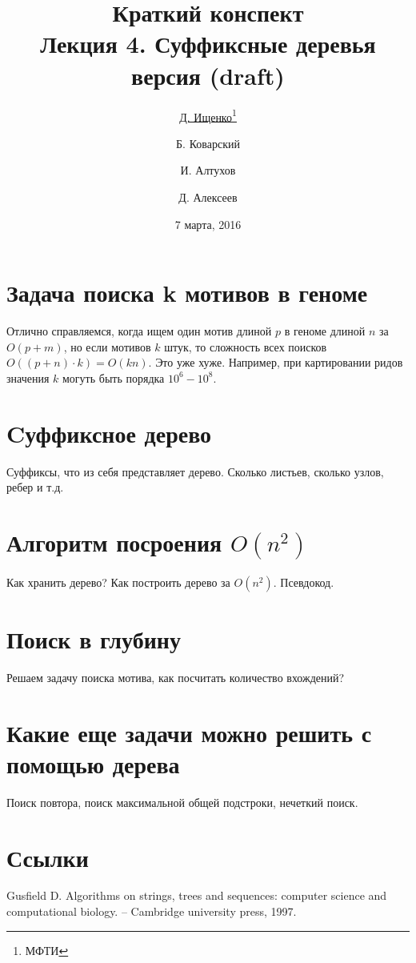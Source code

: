 \documentclass[letterpaper, 11pt]{article}
\title{\large{Краткий конспект}\\
\LARGE{Лекция 4. Суффиксные деревья}\\
\normalsize версия \versionnumber (\textcolor{NavyBlue}{draft})}
\date{7 марта, 2016}
\author{\underline{Д. Ищенко\thanks{МФТИ}} \and Б. Коварский\footnotemark[1]
\and И. Алтухов\footnotemark[1] \and Д. Алексеев\footnotemark[1]}
\begin{document}
\maketitle
\thispagestyle{empty}
\clearpage

\section{Задача поиска k мотивов в геноме}
\par
Отлично справляемся, когда ищем один мотив длиной $p$ в геноме длиной $n$ за $O(p + m)$, но если мотивов $k$ штук, то сложность всех поисков $O((p + n) \cdot k) = O(kn)$. Это уже хуже. Например, при картировании ридов значения $k$ могуть быть порядка $10^6 - 10^8$.
\section{Cуффиксное дерево}
\par
Суффиксы, что из себя представляет дерево. Сколько листьев, сколько узлов, ребер и т.д.
\section{Алгоритм посроения $O(n^2)$}
\par
Как хранить дерево? Как построить дерево за $O(n^2)$. Псевдокод.
\section{Поиск в глубину}
\par
Решаем задачу поиска мотива, как посчитать количество вхождений?
\section{Какие еще задачи можно решить с помощью дерева}
\par
Поиск повтора, поиск максимальной общей подстроки, нечеткий поиск.

\section{Ссылки}

\begingroup
\renewcommand{\section}[2]{}%
\begin{thebibliography}{7}
Gusfield D. Algorithms on strings, trees and sequences: computer science and computational biology. – Cambridge university press, 1997.


\end{thebibliography}
\endgroup
\end{document}
